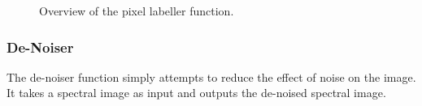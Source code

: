 \documentclass[12pt,twoside,notitlepage]{report}
\begin{document}
\begin{figure}[H]
{\begin{tikzpicture}[node distance=2cm,>=stealth',bend angle=45,auto]
                                    
                            \end{tikzpicture}
                        }

                    \caption{Overview of the pixel labeller function.}
                \end{figure} 




            \subsubsection{De-Noiser}
                The de-noiser function simply attempts to reduce the effect of noise on the image. It takes a spectral 
                image as input and outputs the de-noised spectral image.
\end{document}
